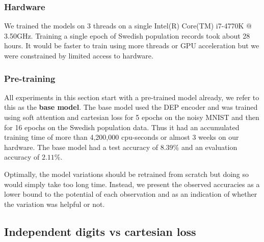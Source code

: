 \subsubsection{Hardware}
We trained the models on 3 threads on a single Intel(R) Core(TM) i7-4770K @ 3.50GHz. Training a single epoch of Swedish population records took about 28 hours. It would be faster to train using more threads or GPU acceleration but we were constrained by limited access to hardware.


\subsubsection{Pre-training}

All experiments in this section start with a pre-trained model already, we refer to this as the \textbf{base model}. The base model used the DEP encoder and was trained using soft attention and cartesian loss for 5 epochs on the noisy MNIST and then for 16 epochs on the Swedish population data. Thus it had an accumulated training time of more than 4,200,000 cpu-seconds or almost 3 weeks on our hardware.
The base model had a test accuracy of $8.39\%$ and an evaluation accuracy of $2.11\%$.

Optimally, the model variations should be retrained from scratch but doing so would simply take too long time.
Instead, we present the observed accuracies as a lower bound to the potential of each observation and as an indication of whether the variation was helpful or not.




\subsection{Independent digits vs cartesian loss} \label{sssec:ind_digits}

